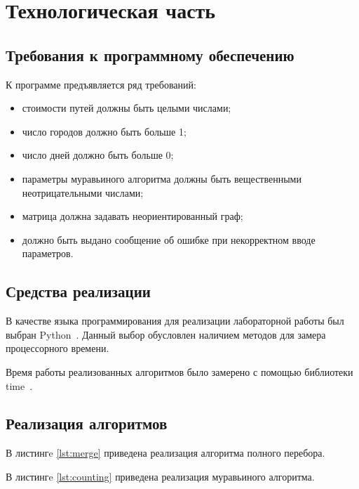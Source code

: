 \section{Технологическая часть}

\subsection{Требования к программному обеспечению}

К программе предъявляется ряд требований:
\begin{itemize}[label*=---]
	\item стоимости путей должны быть целыми числами;
	\item число городов должно быть больше 1;
	\item число дней должно быть больше 0;
	\item параметры муравьиного алгоритма должны быть вещественными неотрицательными числами;
	\item матрица должна задавать неориентированный граф;
	\item должно быть выдано сообщение об ошибке при некорректном вводе параметров.
\end{itemize}

\subsection{Средства реализации}

В качестве языка программирования для реализации лабораторной работы был выбран Python~\cite{python}. Данный выбор обусловлен наличием методов для замера процессорного времени.

Время работы реализованных алгоритмов было замерено с помощью библиотеки time~\cite{time}.

\subsection{Реализация алгоритмов}

В листингe \ref{lst:merge} приведена реализация алгоритма полного перебора.

В листингe \ref{lst:counting} приведена реализация муравьиного алгоритма.
\pagebreak
{}

